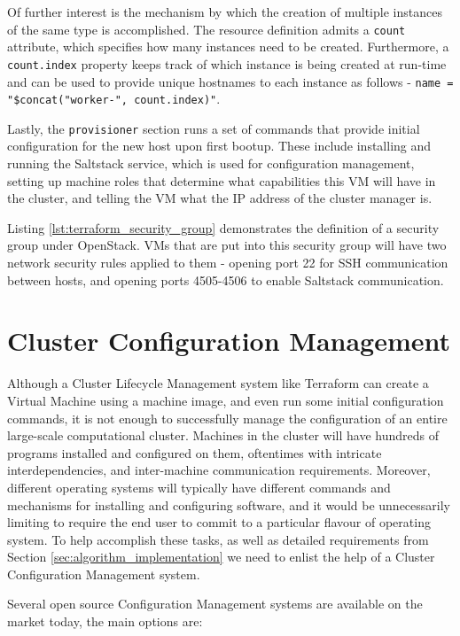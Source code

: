 Of further interest is the mechanism by which the creation of multiple instances of the same type is accomplished. The resource definition admits a \texttt{count} attribute, which specifies how many instances need to be created. Furthermore, a \texttt{count.index} property keeps track of which instance is being created at run-time and can be used to provide unique hostnames to each instance as follows -   \texttt{name = "\${concat("worker-", count.index)}"}.

Lastly, the \texttt{provisioner} section runs a set of commands that provide initial configuration for the new host upon first bootup. These include installing and running the Saltstack service, which is used for configuration management, setting up machine roles  that determine what capabilities this VM will have in the cluster, and telling the VM what the IP address of the cluster manager is.

Listing \ref{lst:terraform_security_group} demonstrates the definition of a security group under OpenStack. VMs that are put into this security group will have two network security rules applied to them - opening port 22 for SSH communication between hosts, and opening ports 4505-4506 to enable Saltstack communication.

\section{Cluster Configuration Management}

Although a Cluster Lifecycle Management system like Terraform can create a Virtual Machine using a machine image, and even run some initial configuration commands, it is not enough to successfully manage the configuration of an entire large-scale computational cluster. Machines in the cluster will have hundreds of programs installed and configured on them, oftentimes with intricate interdependencies, and inter-machine communication requirements. Moreover, different operating systems will typically have different commands and mechanisms for installing and configuring software, and it would be unnecessarily limiting to require the end user to commit to a particular flavour of operating system. To help accomplish these tasks, as well as detailed requirements from Section \ref{sec:algorithm_implementation} we need to enlist the help of a Cluster Configuration Management system.

Several open source Configuration Management systems are available on the market today, the main options are:

